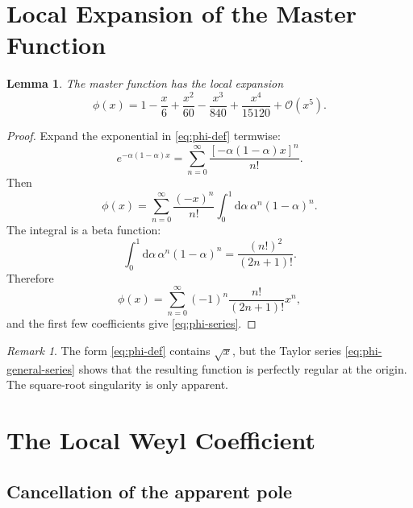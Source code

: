 \documentclass[11pt,a4paper]{article}
\newcommand{\dd}{\mathrm{d}}
\newtheorem{lemma}[theorem]{Lemma}
\theoremstyle{definition}
\theoremstyle{remark}
\newtheorem{remark}[theorem]{Remark}
\begin{document}
\section{Local Expansion of the Master Function}
\label{sec:master}

\begin{lemma}
The master function has the local expansion
\begin{equation}
  \phi(x)
  = 1 - \frac{x}{6} + \frac{x^2}{60}
    - \frac{x^3}{840} + \frac{x^4}{15120}
    + \mathcal O(x^5).
  \label{eq:phi-series}
\end{equation}
\end{lemma}

\begin{proof}
Expand the exponential in \eqref{eq:phi-def} termwise:
\begin{equation}
  e^{-\alpha(1-\alpha)x}
  = \sum_{n=0}^{\infty}
    \frac{[-\alpha(1-\alpha)x]^n}{n!}.
  \label{eq:expansion-exp}
\end{equation}
Then
\begin{equation}
  \phi(x)
  = \sum_{n=0}^{\infty}
    \frac{(-x)^n}{n!}
    \int_0^1 \dd\alpha\, \alpha^n(1-\alpha)^n.
  \label{eq:phi-beta}
\end{equation}
The integral is a beta function:
\begin{equation}
  \int_0^1 \dd\alpha\, \alpha^n(1-\alpha)^n
  = \frac{(n!)^2}{(2n+1)!}.
  \label{eq:beta-integral}
\end{equation}
Therefore
\begin{equation}
  \phi(x)
  = \sum_{n=0}^{\infty}
    (-1)^n\frac{n!}{(2n+1)!}x^n,
  \label{eq:phi-general-series}
\end{equation}
and the first few coefficients give \eqref{eq:phi-series}.
\end{proof}

\begin{remark}
The form \eqref{eq:phi-def} contains $\sqrt{x}$, but the Taylor series
\eqref{eq:phi-general-series} shows that the resulting function is perfectly
regular at the origin.  The square-root singularity is only apparent.
\end{remark}

\section{The Local Weyl Coefficient}
\label{sec:weyl}

\subsection{Cancellation of the apparent pole}
\end{document}
